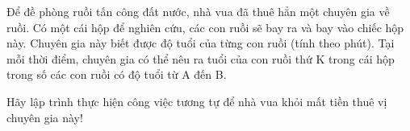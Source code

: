 Để đề phòng ruồi tấn công đất nước, nhà vua đã thuê hẳn một chuyên gia về ruồi. Có một cái hộp để nghiên cứu, các con ruồi sẽ bay ra và bay vào chiếc hộp này. Chuyên gia này biết được độ tuổi của từng con ruồi (tính theo phút). Tại mỗi thời điểm, chuyên gia có thể nêu ra tuổi của con ruồi thứ K trong cái hộp trong số các con ruồi có độ tuổi từ A đến B.  

   Hãy lập trình thực hiện công việc tương tự để nhà vua khỏi mất tiền thuê vị chuyên gia này!  

\